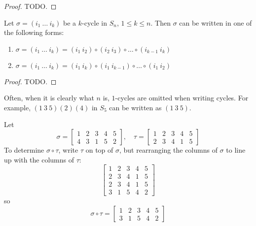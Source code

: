 \begin{proof}
	TODO.
\end{proof}

\begin{lemma}\label{lem:cycleIsProductOfTranspositions}
	Let $\sigma = (i_1 \ \dots \ i_k)$ be a $k$-cycle in $S_n$, $1 \le k \le n$. Then $\sigma$ can be written in one of the following forms:
	\begin{enumerate}
		\item $\sigma = (i_1 \ \dots \ i_k) = (i_1 \ i_2) \circ (i_2 \ i_3) \circ \dots \circ (i_{k - 1} \ i_k)$
		\item $\sigma = (i_1 \ \dots \ i_k) = (i_1 \ i_k) \circ (i_1 \ i_{k - 1}) \circ \dots \circ (i_1 \ i_2)$
	\end{enumerate}
\end{lemma}

\begin{proof}
	TODO.
\end{proof}

\begin{remark}
	Often, when it is clearly what $n$ is, $1$-cycles are omitted when writing cycles. For example, $(1 \ 3 \ 5)(2)(4)$ in $S_5$ can be written as $(1 \ 3 \ 5)$.
\end{remark}

\begin{example}
	Let
	\[
		\sigma = \begin{bmatrix}
			1 & 2 & 3 & 4 & 5 \\
			4 & 3 & 1 & 5 & 2
		\end{bmatrix},
		\quad
		\tau = \begin{bmatrix}
			1 & 2 & 3 & 4 & 5 \\
			2 & 3 & 4 & 1 & 5
		\end{bmatrix}
	\]
	To determine $\sigma \circ \tau$, write $\tau$ on top of $\sigma$, but rearranging the columns of $\sigma$ to line up with the columns of $\tau$:
	\[
		\begin{bmatrix}
			1 & 2 & 3 & 4 & 5 \\
			2 & 3 & 4 & 1 & 5 \\
			2 & 3 & 4 & 1 & 5 \\
			3 & 1 & 5 & 4 & 2
		\end{bmatrix}
	\]
	so
	\[
		\sigma \circ \tau = \begin{bmatrix}
			1 & 2 & 3 & 4 & 5 \\
			3 & 1 & 5 & 4 & 2
		\end{bmatrix}
	\]
\end{example}

